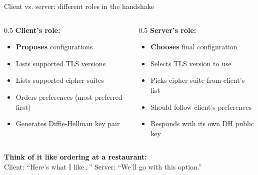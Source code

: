 \ifdefined\PRESENTATION\else\PassOptionsToClass{handout}{beamer}\fi\documentclass[aspectratio=169, lualatex]{beamer}
\begin{document}
\begin{frame}{Client vs. server: different roles in the handshake}
	\begin{columns}[c]
		\begin{column}{0.5\textwidth}
			\textbf{Client's role:}
			\begin{itemize}[<+->]
				\item \textbf{Proposes} configurations
				\item Lists supported TLS versions
				\item Lists supported cipher suites
				\item Orders preferences (most preferred first)
				\item Generates Diffie-Hellman key pair
			\end{itemize}
		\end{column}
		\begin{column}{0.5\textwidth}
			\textbf{Server's role:}
			\begin{itemize}[<+->]
				\item \textbf{Chooses} final configuration
				\item Selects TLS version to use
				\item Picks cipher suite from client's list
				\item Should follow client's preferences
				\item Responds with its own DH public key
			\end{itemize}
		\end{column}
	\end{columns}
	\pause
	\begin{center}
		\textbf{Think of it like ordering at a restaurant:}\\
		Client: ``Here's what I like\ldots'' \quad Server: ``We'll go with this option.''
	\end{center}
\end{frame}
\end{document}

